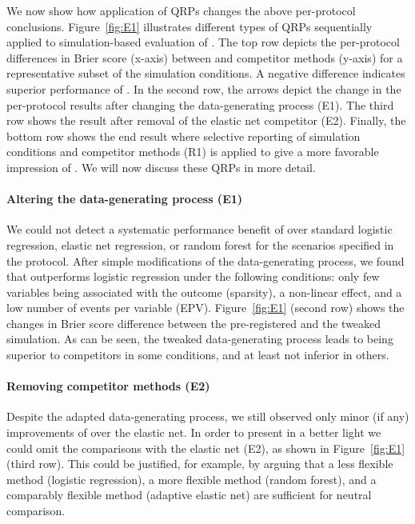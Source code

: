 \documentclass[a4paper, 11pt]{article}
\begin{document}
We now show how application of QRPs changes the above per-protocol conclusions.
Figure~\ref{fig:E1} illustrates different types of QRPs sequentially applied
to simulation-based evaluation of \ainet{}. The top row depicts the 
per-protocol differences in Brier score (x-axis) between \ainet{} and
competitor methods (y-axis) for a representative subset of the simulation
conditions. A negative difference indicates superior performance of \ainet{}.
In the second row, the arrows depict the change in the per-protocol
results after changing the data-generating process (E1). 
The third row shows the result after removal of the elastic net competitor 
(E2). Finally, the bottom row shows the end result where selective reporting 
of simulation conditions and competitor methods (R1) is applied to give 
a more favorable impression of \ainet{}.
We will now discuss these QRPs in more detail.

\paragraph{Altering the data-generating process (E1)}
We could not detect a systematic performance benefit
of \ainet{} over standard logistic regression, elastic net regression, or
random forest for the scenarios specified in the protocol. After simple
modifications of the data-generating process,
we found that 
\ainet{} outperforms logistic regression under the following conditions: 
only few variables being associated with the
outcome (sparsity), a non-linear effect, and a low number of events per
variable (EPV). Figure~\ref{fig:E1} (second row) shows the changes in Brier score 
difference between the pre-registered and the tweaked simulation. As can be seen, the
tweaked data-generating process leads to \ainet{} being superior to competitors 
in some conditions, and at least not inferior in others. 

\paragraph{Removing competitor methods (E2)}
Despite the adapted data-generating process, we still observed only minor (if any)
improvements of \ainet{} over the elastic net. In order to present \ainet{} 
in a better light we could omit the comparisons with the elastic net (E2),
as shown in Figure~\ref{fig:E1} (third row). 
This could be justified, for example, by arguing that a 
less flexible method (logistic regression), a more flexible 
method (random forest), and a comparably flexible method (adaptive elastic net)
are sufficient for neutral comparison.
\end{document}
